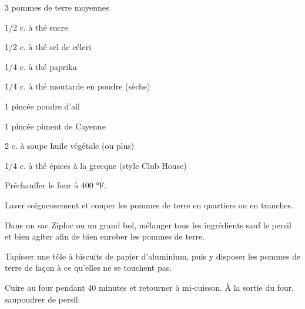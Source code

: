 


\totaltime{}


\begin{ingredients}
    \item 3 pommes de terre moyennes
    \item 1/2 c. à thé sucre
    \item 1/2 c. à thé sel de céleri
    \item 1/4 c. à thé paprika
    \item 1/4 c. à thé moutarde en poudre (sèche)
    \item 1 pincée poudre d'ail
    \item 1 pincée piment de Cayenne
    \item 2 c. à soupe huile végétale (ou plus)
    \item 1/4 c. à thé épices à la grecque (style Club House)
\end{ingredients}

\begin{steps}
    \item Préchauffer le four à 400 °F.
    \item Laver soigneusement et couper les pommes de terre en quartiers ou en tranches.
    \item Dans un sac Ziploc ou un grand bol, mélanger tous les ingrédients sauf le persil et bien agiter afin de bien enrober les pommes de terre.
    \item Tapisser une tôle à biscuits de papier d'aluminium, puis y disposer les pommes de terre de façon à ce qu'elles ne se touchent pas.
    \item Cuire au four pendant 40 minutes et retourner à mi-cuisson. À la sortie du four, saupoudrer de persil.
\end{steps}
